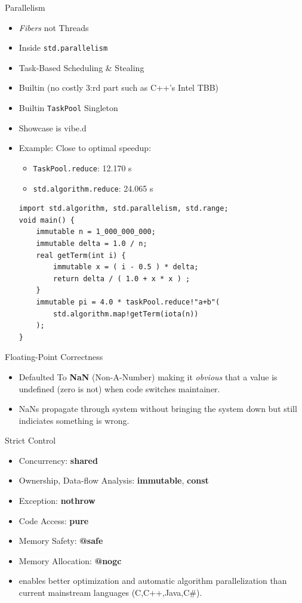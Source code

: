 \documentclass[xcolor=dvipsnames]{beamer}
\begin{document}
\begin{frame}[fragile]{Parallelism}
  \begin{itemize}[<+->]
  \item \emph{Fibers} not Threads
  \item Inside \texttt{std.parallelism}
  \item Task-Based Scheduling \& Stealing
  \item Builtin (no costly 3:rd part such as C++'s Intel TBB)
  \item Builtin \texttt{TaskPool} Singleton
  \item Showcase is vibe.d
  \item Example: Close to optimal speedup:
    \begin{itemize}[<+->]
    \item \texttt{TaskPool.reduce}: 12.170 s
    \item \texttt{std.algorithm.reduce}: 24.065 s
    \end{itemize}
\begin{lstlisting}[frame=single]
import std.algorithm, std.parallelism, std.range;
void main() {
    immutable n = 1_000_000_000;
    immutable delta = 1.0 / n;
    real getTerm(int i) {
        immutable x = ( i - 0.5 ) * delta;
        return delta / ( 1.0 + x * x ) ;
    }
    immutable pi = 4.0 * taskPool.reduce!"a+b"(
        std.algorithm.map!getTerm(iota(n))
    );
}
\end{lstlisting}
  \end{itemize}
\end{frame}

\begin{frame}[fragile]{Floating-Point Correctness}
  \begin{itemize}[<+->]
  \item Defaulted To \textbf{NaN} (Non-A-Number) making it \textit{obvious} that
    a value is undefined (zero is not) when code switches maintainer.
  \item NaNs propagate through system without bringing the system down but still
    indiciates something is wrong.
  \end{itemize}
\end{frame}

\begin{frame}[fragile]{Strict Control}
  \begin{itemize}[<+->]
  \item Concurrency: \textbf{shared}
  \item Ownership, Data-flow Analysis: \textbf{immutable}, \textbf{const}
  \item Exception: \textbf{nothrow}
  \item Code Access: \textbf{pure}
  \item Memory Safety: \textbf{@safe}
  \item Memory Allocation: \textbf{@nogc}
  \item enables better optimization and automatic algorithm parallelization than
    current mainstream languages (C,C++,Java,C\#).
  \end{itemize}
\end{frame}
\end{document}
